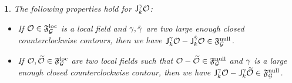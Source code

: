 \documentclass[12pt,oneside,english]{amsart}
\numberwithin{equation}{section}
\numberwithin{figure}{section}
\theoremstyle{plain}
\theoremstyle{plain}
\theoremstyle{plain}
\theoremstyle{plain}
\newtheorem{lem}[thm]{\protect\lemmaname}
\theoremstyle{remark}
\theoremstyle{definition}
\theoremstyle{plain}
\theoremstyle{plain}
\numberwithin{thm}{section}
\newcommand{\kallemod}[1]{{\color{kallecol} {#1}}}
\providecommand{\lemmaname}{Lemma}
\providecommand{\lemmaname}{Lemma}
\providecommand{\lemmaname}{Lemma}
\providecommand{\lemmaname}{Lemma}
\begin{document}
\begin{lem}
\label{lem:equivalence-current-modes}
The following properties hold for $\mathsf{J}_{{k}}^{\gamma}{\mathcal{O}}$:
\begin{itemize}
\item[(a)] If ${\mathcal{O}} \in \mathfrak{F}^\mathrm{loc}_{\mathcal{G}}$ is a local field and
$\gamma,\tilde{\gamma}$ are two
large enough %
closed counterclockwise contours, then we have
$ { \mathsf{J}_{{k}}^{\gamma}{\mathcal{O}} -
\mathsf{J}_{{k}}^{\tilde{\gamma}}{\mathcal{O}} \in \mathfrak{F}^\mathrm{null}_{\mathcal{G}} } $.
\item[(b)]
If ${\mathcal{O}}, \widetilde{{\mathcal{O}}} \in \mathfrak{F}^\mathrm{loc}_{\mathcal{G}}$ are two local 
fields such that
${\mathcal{O}} - \widetilde{{\mathcal{O}}} \in \mathfrak{F}^\mathrm{null}_{\mathcal{G}}$ and 
$\gamma$ is a large enough closed counterclockwise contour, then we have
$ \mathsf{J}_{{k}}^{\gamma}{\mathcal{O}} -
\mathsf{J}_{{k}}^{\gamma}\widetilde{{\mathcal{O}}} \in \mathfrak{F}^\mathrm{null}_{\mathcal{G}}$.
\end{itemize}
\end{lem}
\end{document}
